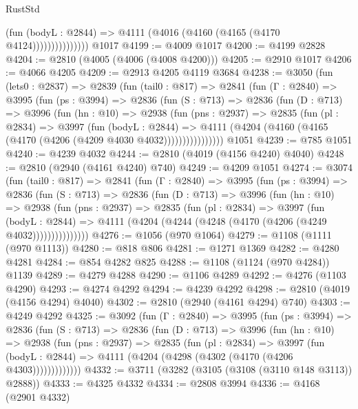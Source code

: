 \begin{lexlean}{RustStd}
\begin{coremodule}
                        (fun (bodyL : @2844) =>
                        @4111 (@4016 (@4160 (@4165 (@4170 @4124)))))))))))))))
    @1017
@4199 := @4009 @1017
@4200 := @4199 @2828
@4204 := @2810 (@4005 (@4006 (@4008 @4200)))
@4205 := @2910 @1017
@4206 := @4066 @4205
@4209 := @2913 @4205 @4119 @3684
@4238 := @3050
    (fun (lets0 : @2837) =>
    @2839
      (fun (tail0 : @817) =>
      @2841
        (fun (Γ : @2840) =>
        @3995
          (fun (ps : @3994) =>
          @2836
            (fun (S : @713) =>
            @2836
              (fun (D : @713) =>
              @3996
                (fun (hn : @10) =>
                @2938
                  (fun (pns : @2937) =>
                  @2835
                    (fun (pl : @2834) =>
                    @3997
                      (fun (bodyL : @2844) =>
                      @4111 (@4204 (@4160 (@4165 (@4170 (@4206 (@4209 @4030 @4032))))))))))))))))
    @1051
@4239 := @785 @1051
@4240 := @4239 @4032
@4244 := @2810 (@4019 (@4156 @4240) @4040)
@4248 := @2810 (@2940 (@4161 @4240) @740)
@4249 := @4209 @1051
@4274 := @3074
    (fun (tail0 : @817) =>
    @2841
      (fun (Γ : @2840) =>
      @3995
        (fun (ps : @3994) =>
        @2836
          (fun (S : @713) =>
          @2836
            (fun (D : @713) =>
            @3996
              (fun (hn : @10) =>
              @2938
                (fun (pns : @2937) =>
                @2835
                  (fun (pl : @2834) =>
                  @3997
                    (fun (bodyL : @2844) =>
                    @4111 (@4204 (@4244 (@4248 (@4170 (@4206 (@4249 @4032)))))))))))))))
@4276 := @1056 (@970 @1064)
@4279 := @1108 (@1111 (@970 @1113))
@4280 := @818 @806
@4281 := @1271 @1369
@4282 := @4280 @4281
@4284 := @854 @4282 @825
@4288 := @1108 (@1124 (@970 @4284)) @1139
@4289 := @4279 @4288
@4290 := @1106 @4289
@4292 := @4276 (@1103 @4290)
@4293 := @4274 @4292
@4294 := @4239 @4292
@4298 := @2810 (@4019 (@4156 @4294) @4040)
@4302 := @2810 (@2940 (@4161 @4294) @740)
@4303 := @4249 @4292
@4325 := @3092
    (fun (Γ : @2840) =>
    @3995
      (fun (ps : @3994) =>
      @2836
        (fun (S : @713) =>
        @2836
          (fun (D : @713) =>
          @3996
            (fun (hn : @10) =>
            @2938
              (fun (pns : @2937) =>
              @2835
                (fun (pl : @2834) =>
                @3997
                  (fun (bodyL : @2844) =>
                  @4111 (@4204 (@4298 (@4302 (@4170 (@4206 @4303)))))))))))))
@4332 := @3711 (@3282 (@3105 (@3108 (@3110 @148 @3113)) @2888))
@4333 := @4325 @4332
@4334 := @2808 @3994
@4336 := @4168 (@2901 @4332)

\end{coremodule}
\end{lexlean}
